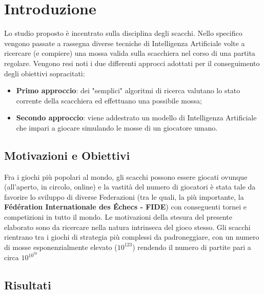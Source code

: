 \chapter{Introduzione}
Lo studio proposto è incentrato sulla disciplina degli scacchi. Nello specifico vengono passate a rassegna diverse tecniche di 
Intelligenza Artificiale volte a ricercare (e compiere) una mossa valida sulla scacchiera nel corso di una partita regolare.
Vengono resi noti i due differenti approcci adottati per il conseguimento degli obiettivi sopracitati: 
\begin{itemize}
    \item \textbf{Primo approccio}: dei "semplici" algoritmi di ricerca valutano lo stato corrente della scacchiera ed effettuano una 
    possibile mossa;
    \item \textbf{Secondo approccio}: viene addestrato un modello di Intelligenza Artificiale che impari a giocare simulando le 
    mosse di un giocatore umano. 
\end{itemize}

\section{Motivazioni e Obiettivi} %
Fra i giochi più popolari al mondo, gli scacchi possono essere giocati ovunque (all'aperto, in circolo, online) e la vastità del numero di 
giocatori è stata tale da favorire lo sviluppo di diverse Federazioni (tra le quali, la più importante, la 
\textbf{Fédération Internationale des Échecs - FIDE}) con conseguenti tornei e competizioni in tutto il mondo. 
Le motivazioni della stesura del presente elaborato sono da ricercare nella natura intrinseca del gioco stesso. Gli scacchi rientrano
tra i giochi di strategia più complessi da padroneggiare, con un numero di mosse esponenzialmente elevato ($10^{123}$) rendendo il numero 
di partite pari a circa $10^{10^{50}}$

\section{Risultati}

